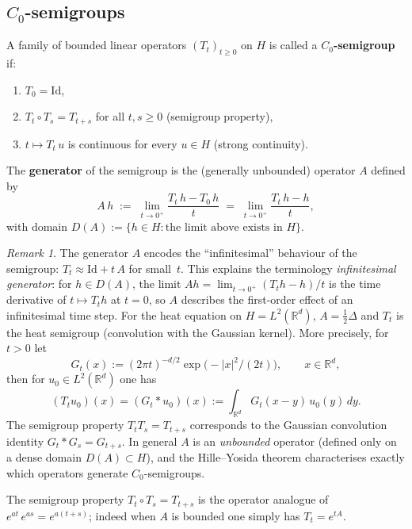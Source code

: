 \documentclass[11pt]{article}
\theoremstyle{definition}
\theoremstyle{remark}
\newtheorem{remark}{Remark}
\begin{document}
\subsection*{$C_0$-semigroups}

A family of bounded linear operators $(T_t)_{t \ge 0}$ on $H$
is called a \textbf{$C_0$-semigroup} if:
\begin{enumerate}
    \item $T_0 = \mathrm{Id}$,
    \item $T_t \circ T_s = T_{t+s}$ for all $t, s \ge 0$ \quad (semigroup property),
    \item $t \mapsto T_t\,u$ is continuous for every $u \in H$
          \quad (strong continuity).
\end{enumerate}

The \textbf{generator} of the semigroup is the (generally unbounded)
operator $A$ defined by
\[
    A\,h
    \;:=\;
    \lim_{t \to 0^+}
    \frac{T_t\,h - T_0\,h}{t}
    \;=\;
    \lim_{t \to 0^+}
    \frac{T_t\,h - h}{t},
\]
with domain $D(A) := \{h \in H : \text{the limit above exists in } H\}$.

\begin{remark}
The generator $A$ encodes the ``infinitesimal'' behaviour of the
semigroup: $T_t \approx \mathrm{Id} + t\,A$ for small~$t$.
This explains the terminology \emph{infinitesimal generator}: for $h\in D(A)$,
the limit $Ah=\lim_{t\to 0^+}(T_th-h)/t$ is the time derivative of
$t\mapsto T_t h$ at $t=0$, so $A$ describes the first-order effect of an
infinitesimal time step.
For the heat equation on $H = L^2(\mathbb{R}^d)$,
$A = \tfrac{1}{2}\Delta$ and $T_t$ is the heat semigroup
(convolution with the Gaussian kernel).  More precisely,
for $t>0$ let
\[
    G_t(x) := (2\pi t)^{-d/2}\exp\!\bigl(-|x|^2/(2t)\bigr),
    \qquad x\in\mathbb{R}^d,
\]
then for $u_0\in L^2(\mathbb{R}^d)$ one has
\[
    (T_t u_0)(x) = (G_t*u_0)(x) := \int_{\mathbb{R}^d} G_t(x-y)\,u_0(y)\,dy.
\]
The semigroup property $T_tT_s=T_{t+s}$ corresponds to the Gaussian convolution identity
$G_t*G_s = G_{t+s}$.
In general $A$ is an
\emph{unbounded} operator (defined only on a dense domain $D(A)
\subset H$), and the Hille--Yosida theorem characterises exactly
which operators generate $C_0$-semigroups.

The semigroup property $T_t \circ T_s = T_{t+s}$ is the operator
analogue of $e^{at}\,e^{as} = e^{a(t+s)}$; indeed when $A$ is bounded
one simply has $T_t = e^{tA}$.
\end{remark}
\end{document}
